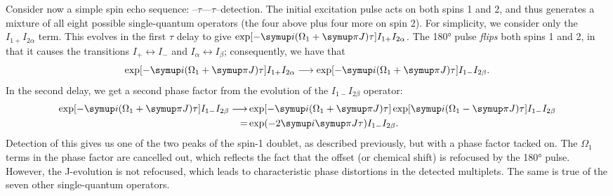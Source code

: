 Consider now a simple spin echo sequence: --$\tau$----$\tau$--detection.
The initial excitation pulse acts on both spins 1 and 2, and thus generates a mixture of all eight possible single-quantum operators (the four above plus four more on spin 2).
For simplicity, we consider only the $I_{1+}I_{2\alpha}$ term.
This evolves in the first $\tau$ delay to give $\exp[-\mi(\Omega_1 + \cpi J)\tau] I_{1+}I_{2\alpha}$.
The \ang{180} pulse \textit{flips} both spins 1 and 2, in that it causes the transitions $I_+ \leftrightarrow I_-$ and $I_\alpha \leftrightarrow I_\beta$; consequently, we have that
\begin{equation}
    \label{eq:spin_echo_1}
    \exp[-\mi(\Omega_1 + \cpi J)\tau] I_{1+}I_{2\alpha} \longrightarrow \exp[-\mi(\Omega_1 + \cpi J)\tau] I_{1-}I_{2\beta}.
\end{equation}
In the second delay, we get a second phase factor from the evolution of the $I_{1-}I_{2\beta}$ operator:
\begin{align}
    \label{eq:spin_echo_2}
    \exp[-\mi(\Omega_1 + \cpi J)\tau] I_{1-}I_{2\beta} \longrightarrow
    &\exp[-\mi(\Omega_1 + \cpi J)\tau] \exp[\mi(\Omega_1 - \cpi J)\tau] I_{1-}I_{2\beta} \notag \\
    = &\exp(-2\mi\cpi J\tau) I_{1-}I_{2\beta}.
\end{align}
Detection of this gives us one of the two peaks of the spin-1 doublet, as described previously, but with a phase factor tacked on.
The $\Omega_1$ terms in the phase factor are cancelled out, which reflects the fact that the offset (or chemical shift) is refocused by the \ang{180} pulse.
However, the J-evolution is not refocused, which leads to characteristic phase distortions in the detected multiplets.
The same is true of the seven other single-quantum operators.

